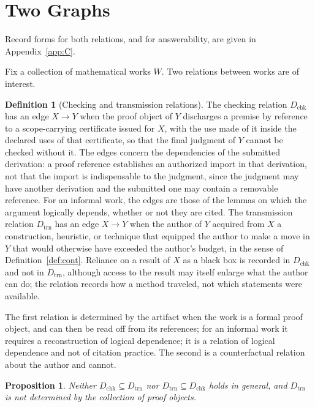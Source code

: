 \documentclass[11pt]{book}
\newtheorem{proposition}[theorem]{Proposition}
\theoremstyle{definition}
\newtheorem{definition}[theorem]{Definition}
\theoremstyle{remark}
\begin{document}
\section{Two Graphs}

Record forms for both relations, and for answerability, are given in Appendix~\ref{app:C}.


Fix a collection of mathematical works $W$. Two relations between works are of interest.

\begin{definition}[Checking and transmission relations]
The checking relation $D_{\mathrm{chk}}$ has an edge $X\to Y$ when the proof object of $Y$ discharges a premise by reference to a scope-carrying certificate issued for $X$, with the use made of it inside the declared uses of that certificate, so that the final judgment of $Y$ cannot be checked without it. The edges concern the dependencies of the submitted derivation: a proof reference establishes an authorized import in that derivation, not that the import is indispensable to the judgment, since the judgment may have another derivation and the submitted one may contain a removable reference. For an informal work, the edges are those of the lemmas on which the argument logically depends, whether or not they are cited. The transmission relation $D_{\mathrm{trn}}$ has an edge $X\to Y$ when the author of $Y$ acquired from $X$ a construction, heuristic, or technique that equipped the author to make a move in $Y$ that would otherwise have exceeded the author's budget, in the sense of Definition~\ref{def:cont}. Reliance on a result of $X$ as a black box is recorded in $D_{\mathrm{chk}}$ and not in $D_{\mathrm{trn}}$, although access to the result may itself enlarge what the author can do; the relation records how a method traveled, not which statements were available.
\end{definition}

The first relation is determined by the artifact when the work is a formal proof object, and can then be read off from its references; for an informal work it requires a reconstruction of logical dependence; it is a relation of logical dependence and not of citation practice. The second is a counterfactual relation about the author and cannot.

\begin{proposition}\label{prop:graphs}
Neither $D_{\mathrm{chk}}\subseteq D_{\mathrm{trn}}$ nor $D_{\mathrm{trn}}\subseteq D_{\mathrm{chk}}$ holds in general, and $D_{\mathrm{trn}}$ is not determined by the collection of proof objects.
\end{proposition}
\end{document}
